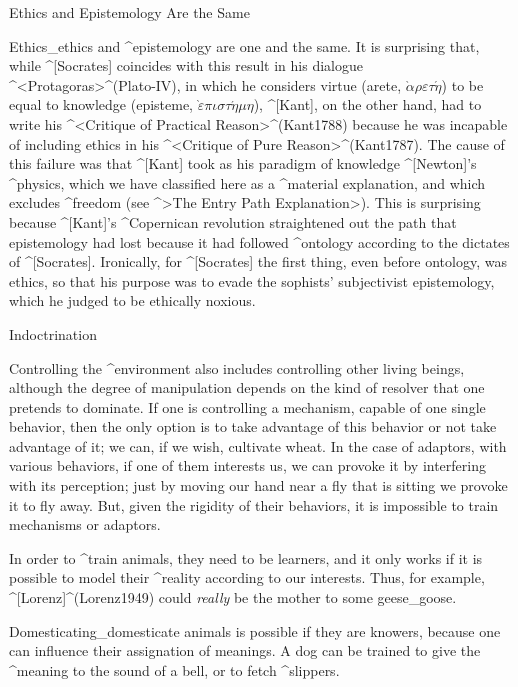 \Section Ethics and Epistemology Are the Same

Ethics_{ethics} and ^{epistemology} are one and the same. It is
surprising that, while ^[Socrates] coincides with this result in his
dialogue ^<Protagoras>^(Plato-IV), in which he considers virtue
  (arete, $\grave\alpha\rho\varepsilon\tau\acute\eta$)
 to be equal to knowledge
  (episteme, $\grave\varepsilon\pi\iota\sigma\tau\acute\eta\mu\eta$),
^[Kant], on the other hand, had to write his ^<Critique of Practical
Reason>^(Kant1788) because he was incapable of including ethics in his
^<Critique of Pure Reason>^(Kant1787). The cause of this failure was
that ^[Kant] took as his paradigm of knowledge ^[Newton]'s ^{physics},
which we have classified here as a ^{material explanation}, and which
excludes ^{freedom} (see ^>The Entry Path Explanation>). This is
surprising because ^[Kant]'s ^{Copernican revolution} straightened out
the path that epistemology had lost because it had followed ^{ontology}
according to the dictates of ^[Socrates]. Ironically, for ^[Socrates]
the first thing, even before ontology, was ethics, so that his purpose
was to evade the sophists' subjectivist epistemology, which he judged to
be ethically noxious.


\Section Indoctrination

Controlling the ^{environment} also includes controlling other living
beings, although the degree of manipulation depends on the kind of
resolver that one pretends to dominate. If one is controlling a
mechanism, capable of one single behavior, then the only option is to
take advantage of this behavior or not take advantage of it; we can, if
we wish, cultivate wheat. In the case of adaptors, with various
behaviors, if one of them interests us, we can provoke it by interfering
with its perception; just by moving our hand near a fly that is sitting
we provoke it to fly away. But, given the rigidity of their behaviors,
it is impossible to train mechanisms or adaptors.

In order to ^{train} animals, they need to be learners, and it only
works if it is possible to model their ^{reality} according to our
interests. Thus, for example, ^[Lorenz]^(Lorenz1949) could {\em really}
be the mother to some geese_{goose}.

Domesticating_{domesticate} animals is possible if they are knowers,
because one can influence their assignation of meanings. A dog can be
trained to give the ^{meaning}  to the sound of a bell, or
to fetch ^{slippers}.

